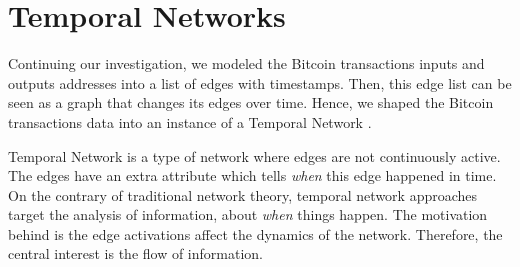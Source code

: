 \documentclass[../../thesis.tex]{subfiles}
\begin{document}
\section{Temporal Networks}
\label{sec: temporal_network}


Continuing our investigation, we modeled the Bitcoin transactions inputs and outputs addresses into a list of edges with timestamps. Then, this edge list can be seen as a graph that changes its edges over time. Hence, we shaped the Bitcoin transactions data into an instance of a Temporal Network \cite{temporalNetworks}.



Temporal Network is a type of network where edges are not continuously active. The edges have an extra attribute which tells \textit{when} this edge happened in time. On the contrary of traditional network theory, temporal network approaches target the analysis of information, about \textit{when} things happen. The motivation behind is the edge activations affect the dynamics of the network. Therefore, the central interest is the flow of information.
\end{document}

